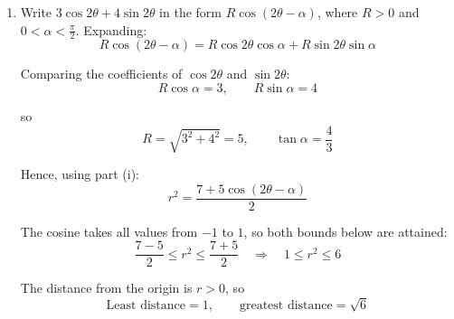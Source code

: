 \documentclass[leqno]{article}
\begin{document}
\begin{enumerate}[
  label=\textbf{\arabic*.},
  leftmargin=*,
  topsep=0pt,
  partopsep=0pt,
  parsep=0pt
]
\begin{djsSolution}
\begin{enumerate}[label=\textbf{(\roman*)}, start=1]
\item Write \(3\cos2\theta+4\sin2\theta\) in the form \(R\cos(2\theta-\alpha)\), where \(R>0\) and \(0<\alpha<\frac{\pi}{2}\). Expanding:
\[
R\cos(2\theta-\alpha)=R\cos2\theta\cos\alpha+R\sin2\theta\sin\alpha
\]

Comparing the coefficients of \(\cos2\theta\) and \(\sin2\theta\):
\[
R\cos\alpha=3,\qquad R\sin\alpha=4
\]

so
\[
R=\sqrt{3^2+4^2}=5,\qquad \tan\alpha=\dfrac43
\]

Hence, using part (i):
\[
r^2=\dfrac{7+5\cos(2\theta-\alpha)}{2}
\]

The cosine takes all values from \(-1\) to \(1\), so both bounds below are attained:
\[
\dfrac{7-5}{2}\leq r^2\leq\dfrac{7+5}{2}
\quad\Longrightarrow\quad
1\leq r^2\leq6
\]

The distance from the origin is \(r>0\), so
\[
\text{Least distance}=1,\qquad \text{greatest distance}=\sqrt6
\]

\end{enumerate}
\end{djsSolution}

\newpage

\questionitem

\begin{figure}[H]
    \centering
{}
\end{figure}



\end{enumerate}
\end{document}
